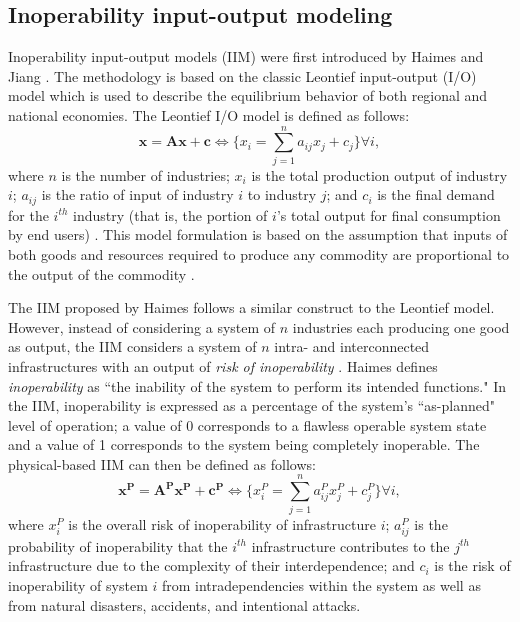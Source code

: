 
\subsection{Inoperability input-output modeling}
\label{sec:ch1:interdependentreliability:iim}

Inoperability input-output models (IIM) were first introduced by Haimes and Jiang \cite{Haimes2001}.  The methodology is based on the classic Leontief input-output (I/O) model which is used to describe the equilibrium behavior of both regional and national economies.  The Leontief I/O model is defined as follows:
%
\begin{equation}
\mathbf{x} = \mathbf{Ax} + \mathbf{c} \Leftrightarrow \{x_i = \sum_{j=1}^n a_{ij}x_j + c_j \} \forall i,
\end{equation}
%
where $n$ is the number of industries; $x_{i}$ is the total production output of industry $i$; $a_{ij}$ is the ratio of input of industry $i$ to industry $j$; and $c_i$  is the final demand for the $i^{th}$ industry (that is, the portion of $i$'s total output for final consumption by end users) \cite{Haimes2005}.  This model formulation is based on the assumption that inputs of both goods and resources required to produce any commodity are proportional to the output of the commodity \cite{Haimes2001}.

The IIM proposed by Haimes follows a similar construct to the Leontief model.  However, instead of considering a system of $n$ industries each producing one good as output, the IIM considers a system of $n$ intra- and interconnected infrastructures with an output of \emph{risk of inoperability} \cite{Haimes2001}.  Haimes defines \emph{inoperability} as ``the inability of the system to perform its intended functions."  In the IIM, inoperability is expressed as a percentage of the system's ``as-planned" level of operation; a value of 0 corresponds to a flawless operable system state and a value of 1 corresponds to the system being completely inoperable.  The physical-based IIM can then be defined as follows:
%
\begin{equation}
\mathbf{x^P} = \mathbf{A^Px^P} + \mathbf{c^P} \Leftrightarrow \{x^P_i = \sum_{j=1}^n a^P_{ij}x^P_j + c^P_j \} \forall i,
\end{equation}
%
where $x^P_i$ is the overall risk of inoperability of infrastructure $i$; $a^P_{ij}$ is the probability of inoperability that the $i^{th}$ infrastructure contributes to the $j^{th}$ infrastructure due to the complexity of their interdependence; and $c_i$ is the risk of inoperability of system $i$ from intradependencies within the system as well as from natural disasters, accidents, and intentional attacks.

